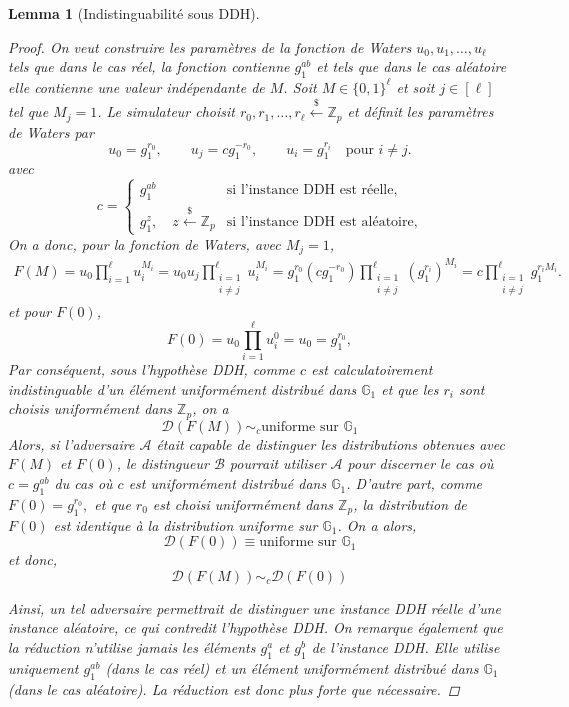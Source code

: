 \documentclass[10pt,a4paper]{article}
\theoremstyle{definition}
\theoremstyle{plain}
\newtheorem{lemma}[definition]{Lemma}
\theoremstyle{remark}
\newcommand{\sample}{\xleftarrow{\$}}
\begin{document}
\begin{lemma}[Indistinguabilité sous DDH]
\begin{proof}
On veut construire les paramètres de la fonction de Waters $u_0,u_1,\dots,u_{\ell}$ tels que dans le cas réel,
la fonction contienne $g_1^{ab}$ et tels que dans le cas aléatoire elle
contienne une valeur indépendante de $M$.
Soit $M\in\{0,1\}^{\ell}$ et soit $j\in[\ell]$ tel que $M_j=1$.
Le simulateur choisit
$
r_0,r_1,\ldots,r_\ell\sample\mathbb{Z}_p
$
et définit les paramètres de Waters par
\[
u_0=g_1^{r_0},
\qquad
u_j=cg_1^{-r_0},
\qquad
u_i=g_1^{r_i}
\quad\text{pour } i\neq j.
\]
avec
\[
c=
\begin{cases}
g_1^{ab} & \text{si l'instance DDH est réelle},\\
g_1^z,\quad z\sample\mathbb{Z}_p & \text{si l'instance DDH est aléatoire},
\end{cases}
\]
On a donc, pour la fonction de Waters, avec $M_j=1$,
\[
\begin{aligned}
F(M)
= u_0\prod_{i=1}^{\ell}u_i^{M_i}
= u_0u_j\prod_{\substack{i=1\\i\neq j}}^{\ell}u_i^{M_i}
= g_1^{r_0}\left(cg_1^{-r_0}\right)
\prod_{\substack{i=1\\i\neq j}}^{\ell}
\left(g_1^{r_i}\right)^{M_i}
= c\prod_{\substack{i=1\\i\neq j}}^{\ell}g_1^{r_iM_i}.
\end{aligned}
\]
et pour $F(0)$,
\[
F(0)
=
u_0\prod_{i=1}^{\ell}u_i^0
=
u_0
=
g_1^{r_0},
\]
Par conséquent, sous l'hypothèse DDH, comme $c$ est calculatoirement
indistinguable d'un élément uniformément distribué dans $\mathbb{G}_1$
et que les $r_i$ sont choisis uniformément dans $\mathbb{Z}_p$, on a
\[
\mathcal{D}(F(M))
\sim_c
\text{uniforme sur } \mathbb{G}_1
\]
Alors, si l'adversaire $\mathcal{A}$ était capable de distinguer les
distributions obtenues avec $F(M)$ et $F(0)$, le distingueur
$\mathcal{B}$ pourrait utiliser $\mathcal{A}$ pour discerner le cas
où $c=g_1^{ab}$ du cas où $c$ est uniformément distribué dans
$\mathbb{G}_1$.
D'autre part, comme
$
F(0)=g_1^{r_0},
$
et que $r_0$ est choisi uniformément dans $\mathbb{Z}_p$, la distribution
de $F(0)$ est identique à la distribution uniforme sur $\mathbb{G}_1$.
On a alors,
\[
\mathcal{D}(F(0))
\equiv
\text{uniforme sur }\mathbb{G}_1
\]
et donc, 
\[
\mathcal{D}(F(M))
\sim_c
\mathcal{D}(F(0))
\]

Ainsi, un tel adversaire permettrait de distinguer une instance DDH
réelle d'une instance aléatoire, ce qui contredit l'hypothèse DDH.
On remarque également que la réduction n'utilise jamais les éléments
$g_1^a$ et $g_1^b$ de l'instance DDH. Elle utilise uniquement
$g_1^{ab}$ (dans le cas réel) et un élément uniformément distribué
dans $\mathbb{G}_1$ (dans le cas aléatoire). La réduction est donc
plus forte que nécessaire.

\end{proof}
\end{lemma}
\end{document}
